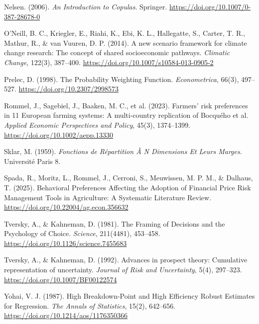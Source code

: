 \documentclass[12pt,a4paper]{article}
\begin{document}
\begin{description}
\item Nelsen. (2006). \textit{An Introduction to Copulas}. Springer. \url{https://doi.org/10.1007/0-387-28678-0}

\item O'Neill, B. C., Kriegler, E., Riahi, K., Ebi, K. L., Hallegatte, S., Carter, T. R., Mathur, R., \& van Vuuren, D. P. (2014). A new scenario framework for climate change research: The concept of shared socioeconomic pathways. \textit{Climatic Change}, 122(3), 387--400. \url{https://doi.org/10.1007/s10584-013-0905-2}

\item Prelec, D. (1998). The Probability Weighting Function. \textit{Econometrica}, 66(3), 497--527. \url{https://doi.org/10.2307/2998573}

\item Rommel, J., Sagebiel, J., Baaken, M. C., et al. (2023). Farmers' risk preferences in 11 European farming systems: A multi-country replication of Bocqu\'{e}ho et al. \textit{Applied Economic Perspectives and Policy}, 45(3), 1374--1399. \url{https://doi.org/10.1002/aepp.13330}

\item Sklar, M. (1959). \textit{Fonctions de R\'{e}partition \`{A} N Dimensions Et Leurs Marges}. Universit\'{e} Paris 8.

\item Spada, R., Moritz, L., Rommel, J., Cerroni, S., Meuwissen, M. P. M., \& Dalhaus, T. (2025). Behavioral Preferences Affecting the Adoption of Financial Price Risk Management Tools in Agriculture: A Systematic Literature Review. \url{https://doi.org/10.22004/ag.econ.356632}

\item Tversky, A., \& Kahneman, D. (1981). The Framing of Decisions and the Psychology of Choice. \textit{Science}, 211(4481), 453--458. \url{https://doi.org/10.1126/science.7455683}

\item Tversky, A., \& Kahneman, D. (1992). Advances in prospect theory: Cumulative representation of uncertainty. \textit{Journal of Risk and Uncertainty}, 5(4), 297--323. \url{https://doi.org/10.1007/BF00122574}

\item Yohai, V. J. (1987). High Breakdown-Point and High Efficiency Robust Estimates for Regression. \textit{The Annals of Statistics}, 15(2), 642--656. \url{https://doi.org/10.1214/aos/1176350366}

\end{description}
\end{document}
